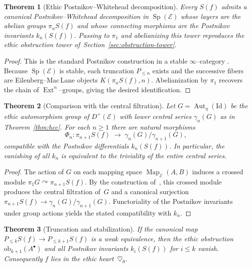 \documentclass[12pt]{article}
\DeclareMathOperator{\Aut}{Aut}
\DeclareMathOperator{\Map}{Map}
\DeclareMathOperator{\Sp}{Sp}
\newcommand{\E}{\mathcal{E}}
\newcommand{\Ext}{\operatorname{Ext}}
\theoremstyle{plain}
\newtheorem{theorem}{Theorem}[section]
\theoremstyle{definition}
\theoremstyle{remark}
\numberwithin{equation}{section}
\begin{document}
\begin{theorem}[Ethic Postnikov–Whitehead decomposition]\label{th:ethic-decomposition}
Every $S(f)$ admits a canonical Postnikov–Whitehead decomposition in $\Sp(\E)$
whose layers are the abelian groups $\pi_nS(f)$ and whose connecting morphisms are the Postnikov invariants $k_n(S(f))$.  
Passing to $\pi_1$ and abelianizing this tower reproduces the ethic obstruction tower of~Section~\ref{sec:obstruction-tower}.
\end{theorem}

\begin{proof}
This is the standard Postnikov construction in a stable $\infty$–category \cite{LurieHA}.  
Because $\Sp(\E)$ is stable, each truncation $P_{\le n}$ exists and the successive fibers are Eilenberg--Mac\,Lane objects $K(\pi_nS(f),n)$.
Abelianization by $\pi_1$ recovers the chain of $\Ext^n$–groups, giving the desired identification.
\end{proof}

\begin{theorem}[Comparison with the central filtration]\label{th:comparison-central}
Let $G=\Aut_\eta(\mathrm{Id})$ be the ethic automorphism group of $D^+(\E)$
with lower central series $\gamma_n(G)$ as in Theorem~\ref{thm:hcc}.  
For each $n\ge1$ there are natural morphisms
\[
\Phi_n:\pi_{n+1}S(f)\;\longrightarrow\;\gamma_n(G)/\gamma_{n+1}(G),
\]
compatible with the Postnikov differentials $k_n(S(f))$.  
In particular, the vanishing of all $k_n$ is equivalent to the triviality of the entire central series.
\end{theorem}

\begin{proof}
The action of $G$ on each mapping space $\Map_\E(A,B)$ induces a crossed module
$\pi_1G\curvearrowright \pi_{n+1}S(f)$.
By the construction of~\cite{MikhailovSingh2011}, this crossed module produces the central filtration of~$G$ and a canonical surjection
$\pi_{n+1}S(f)\to\gamma_n(G)/\gamma_{n+1}(G)$.
Functoriality of the Postnikov invariants under group actions
\cite{LurieHA}
yields the stated compatibility with $k_n$.
\end{proof}

\begin{theorem}[Truncation and stabilization]\label{th:truncation-stabilization}
If the canonical map $P_{\le k}S(f)\to P_{\le k+1}S(f)$ is a weak equivalence,
then the ethic obstruction $\mathrm{ob}_{k+1}(A^\bullet)$
and all Postnikov invariants $k_i(S(f))$ for $i\le k$ vanish.
Consequently $f$ lies in the ethic heart~$\heartsuit_\eth$.
\end{theorem}
\end{document}
